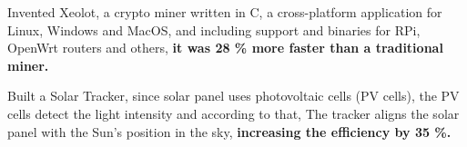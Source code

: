 \documentclass[a4paper]{deedy-resume} %
\begin{document}
\begin{minipage}[t]{0.66\textwidth}

Invented Xeolot, a crypto miner written in C, a cross-platform application for Linux, Windows and MacOS, and including support and binaries for RPi, OpenWrt routers and others, \textbf{it was 28 \% more faster than a traditional miner.} \\

\sectionspace %





Built a Solar Tracker, since solar panel uses photovoltaic cells (PV cells), the PV cells detect the light intensity and according to that, The tracker aligns the solar panel with the Sun's position in the sky, \textbf{increasing the efficiency by 35 \%. }\\

\sectionspace %



\end{minipage} %
\end{document}

